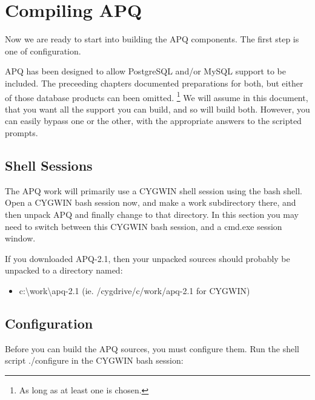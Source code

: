 \documentclass[english]{report}
\begin{document}
\chapter{Compiling APQ}

Now we are ready to start into building the APQ components. The first
step is one of configuration.

APQ has been designed to allow PostgreSQL and/or MySQL support to
be included. The preceeding chapters documented preparations for both,
but either of those database products can been omitted.%
\footnote{As long as at least one is chosen.%
} We will assume in this document, that you want all the support you
can build, and so will build both. However, you can easily bypass
one or the other, with the appropriate answers to the scripted prompts.


\section{Shell Sessions}

The APQ work will primarily use a CYGWIN shell session using the bash
shell. Open a CYGWIN bash session now, and make a work subdirectory
there, and then unpack APQ and finally change to that directory. In
this section you may need to switch between this CYGWIN bash session,
and a cmd.exe session window.

If you downloaded APQ-2.1, then your unpacked sources should probably
be unpacked to a directory named:

\begin{itemize}
\item c:\textbackslash{}work\textbackslash{}apq-2.1 (ie. /cygdrive/c/work/apq-2.1
for CYGWIN)
\end{itemize}

\section{Configuration}

Before you can build the APQ sources, you must configure them. Run
the shell script ./configure in the CYGWIN bash session:
\end{document}
